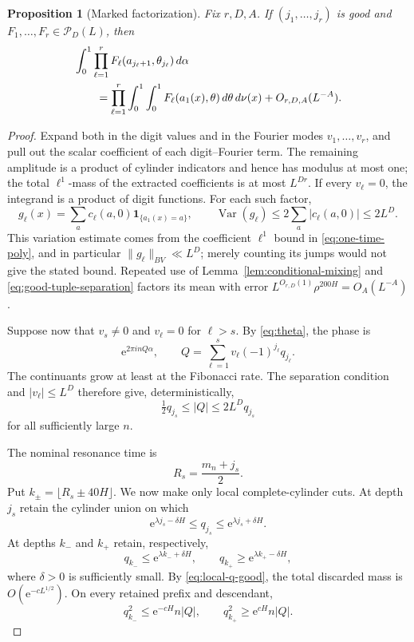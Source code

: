 \documentclass[11pt,a4paper]{amsart}
\newtheorem{proposition}[theorem]{Proposition}
\theoremstyle{definition}
\theoremstyle{remark}
\newcommand{\ind}{\mathbf 1}
\newcommand{\Var}{\operatorname{Var}}
\newcommand{\e}{\mathrm e}
\begin{document}
\begin{proposition}[Marked factorization]\label{prop:marked-factorization}
Fix $r,D,A$.  If $(j_1,\ldots,j_r)$ is good and
$F_1,\ldots,F_r\in\mathcal P_D(L)$, then
\begin{align}\label{eq:marked-factorization}
 &\int_0^1\prod_{\ell=1}^r
 F_\ell(a_{j_\ell+1},\theta_{j_\ell})\,d\alpha\\
 &\qquad=
 \prod_{\ell=1}^r\int_0^1\int_0^1
 F_\ell(a_1(x),\theta)\,d\theta\,d\nu(x)
 +O_{r,D,A}(L^{-A}).\notag
\end{align}
\end{proposition}

\begin{proof}
Expand both in the digit values and in the Fourier modes
$v_1,\ldots,v_r$, and pull out the scalar coefficient of each
digit--Fourier term.  The remaining amplitude is a product of cylinder
indicators and hence has modulus at most one; the total $\ell^1$-mass of the
extracted coefficients is at most $L^{Dr}$.  If every $v_\ell=0$, the
integrand is a product of digit functions.  For each such factor,
\[
 g_\ell(x)=\sum_a c_\ell(a,0)\ind_{\{a_1(x)=a\}},
 \qquad
 \Var(g_\ell)\le2\sum_a|c_\ell(a,0)|\le2L^D.
\]
This variation estimate comes from the coefficient $\ell^1$ bound in
\eqref{eq:one-time-poly}, and in particular $\|g_\ell\|_{BV}\ll L^D$; merely
counting its jumps would not give the stated bound.  Repeated use of
Lemma~\ref{lem:conditional-mixing} and
\eqref{eq:good-tuple-separation} factors its mean with error
$L^{O_{r,D}(1)}\rho^{200H}=O_A(L^{-A})$.

Suppose now that $v_s\ne0$ and $v_\ell=0$ for $\ell>s$.  By
\eqref{eq:theta}, the phase is
\[
 \e^{2\pi i nQ\alpha},
 \qquad
 Q=\sum_{\ell=1}^{s}v_\ell(-1)^{j_\ell}q_{j_\ell}.
\]
The continuants grow at least at the Fibonacci rate.  The separation
condition and $|v_\ell|\le L^D$ therefore give, deterministically,
\begin{equation}\label{eq:Q-dominance}
 \tfrac12q_{j_s}\le|Q|\le2L^Dq_{j_s}
\end{equation}
for all sufficiently large $n$.

The nominal resonance time is
\[
 R_s=\frac{m_n+j_s}{2}.
\]
Put $k_\pm=\lfloor R_s\pm40H\rfloor$.  We now make only local complete-cylinder
cuts.  At depth $j_s$ retain the cylinder union on which
\[
 \e^{\lambda j_s-\delta H}\le q_{j_s}
 \le \e^{\lambda j_s+\delta H}.
\]
At depths $k_-$ and $k_+$ retain, respectively,
\[
 q_{k_-}\le \e^{\lambda k_-+\delta H},\qquad
 q_{k_+}\ge \e^{\lambda k_+-\delta H},
\]
where $\delta>0$ is sufficiently small.  By
\eqref{eq:local-q-good}, the total discarded mass is
$O(\e^{-cL^{1/2}})$.  On every retained prefix and descendant,
\begin{equation}\label{eq:pre-post-resonance}
 q_{k_-}^2\le \e^{-cH}n|Q|,
 \qquad
 q_{k_+}^2\ge \e^{cH}n|Q|.
\end{equation}


\end{proof}
\end{document}
